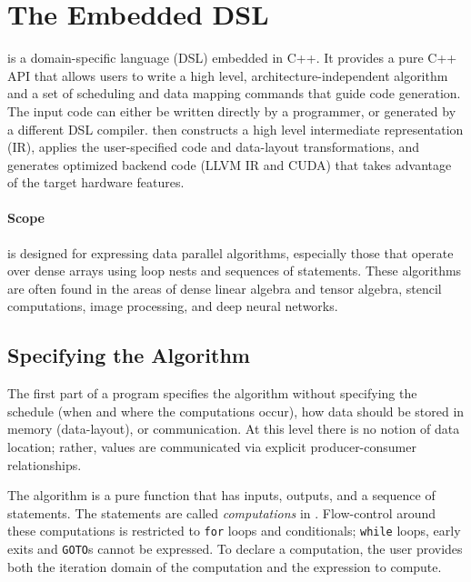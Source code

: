 \vspace{-0.25cm}
\section{The \framework Embedded DSL}

\framework{} is a domain-specific language (DSL) embedded in C++. It provides a pure C++ API that allows users to write a high level, architecture-independent algorithm and a set of scheduling and data mapping commands that guide code generation.
The input \framework code can either be written directly by a programmer, or generated by a different DSL compiler.  \framework{} then constructs a high level intermediate representation (IR), applies the user-specified code and data-layout transformations, and generates optimized backend code (LLVM IR and CUDA) that takes advantage of the target hardware features.


\vspace{-0.25cm}
\paragraph{\textbf{Scope}}
\framework is designed for expressing data parallel algorithms, especially those that operate over dense arrays using loop nests and sequences of statements.  These algorithms are often found in the areas of dense linear algebra and tensor algebra, stencil computations, image processing, and deep neural networks.

\vspace{-0.3cm}
\subsection{Specifying the Algorithm}
The first part of a \framework{} program specifies the algorithm without specifying the schedule (when and where the computations occur), how data should be stored in memory (data-layout), or communication.
At this level there is no notion of data location; rather, values are communicated via explicit producer-consumer relationships.

The algorithm is a pure function that has inputs, outputs, and a sequence of statements.  The statements are called \textit{computations} in \framework.  Flow-control around these computations is restricted to \texttt{for} loops and conditionals;  \texttt{while} loops, early exits and \texttt{GOTO}s cannot be expressed.  To declare a computation, the user provides both the iteration domain of the computation and the expression to compute.  %

